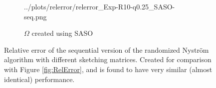 \documentclass{article}
\theoremstyle{definition}
\begin{document}
\begin{appendices}
\begin{figure}[!ht]
\begin{subfigure}[t]{0.35\textwidth}
        {../plots/relerror/relerror_Exp-R10-q0.25_SASO-seq.png}
    \caption{$\Omega$ created using SASO}
\end{subfigure}\hfill \caption{Relative error of the sequential version of the
randomized Nyström algorithm with different sketching matrices. Created for
comparison with Figure \ref{fig:RelError}, and is found to have very similar
(almost identical) performance.}
\label{fig:SequentialRelError}
\end{figure}
\end{appendices}
\end{document}

